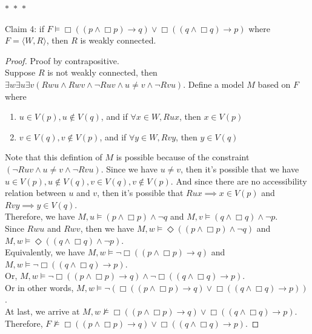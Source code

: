 \documentclass[12pt]{article}
\newcommand{\B}{\Box}
\newcommand{\D}{\Diamond}
\newcommand{\s}{\vDash}
\newcommand{\ns}{\nvDash}
\begin{document}
\noindent
\begin{center}
    $\ast$~$\ast$~$\ast$
\end{center}
Claim 4: if $F \vDash \B((p \land \B p) \to q) \lor \B((q \land \B q) \to p)$ where $F = \langle W, R \rangle$, then $R$ is weakly connected. 
\begin{proof} Proof by contrapositive.\\
    Suppose $R$ is not weakly connected, then $\exists w \exists u \exists v (Rwu \land Rwv \land \neg Ruv \land u \neq v \land \neg Rvu)$.
    Define a model $M$ based on $F$ where
    \begin{enumerate}
        \item $u \in V(p), u \notin V(q)$, and if $\forall x \in W, Rux$, then $x \in V(p)$
        \item $v \in V(q), v \notin V(p)$, and if $\forall y \in W, Rvy$, then $y \in V(q)$
    \end{enumerate}
    Note that this defintion of $M$ is possible because of the constraint $(\neg Ruv \land u \neq v \land \neg Rvu)$.
    Since we have $u \neq v$, then it's possible that we have $u \in V(p), u \notin V(q), v \in V(q), v \notin V(p)$.
    And since there are no accessibility relation between $u$ and $v$, then it's possible that $Rux \implies x \in V(p)$ and $Rvy \implies y \in V(q)$.\\
    Therefore, we have $M, u \s (p \land \B p) \land \neg q$ and $M, v \s (q \land \B q) \land \neg p$.\\
    Since $Rwu$ and $Rwv$, then we have $M, w \s \D ((p \land \B p) \land \neg q)$ and $M, w \s \D ((q \land \B q) \land \neg p)$.\\
    Equivalently, we have $M, w \s \neg \B ((p \land \B p) \to q)$ and $M, w \s \neg \B ((q \land \B q) \to p)$.\\
    Or, $M, w \s \neg \B ((p \land \B p) \to q) \land \neg \B ((q \land \B q) \to p)$.\\
    Or in other words, $M, w \s \neg(\B ((p \land \B p) \to q) \lor \B ((q \land \B q) \to p))$.\\
    At last, we arrive at $M, w \ns \B ((p \land \B p) \to q) \lor \B ((q \land \B q) \to p)$.\\
    Therefore, $F \ns \B ((p \land \B p) \to q) \lor \B ((q \land \B q) \to p)$.

\end{proof}
\end{document}
